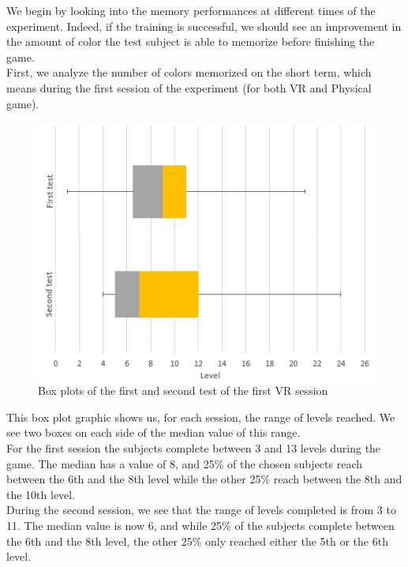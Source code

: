 \documentclass[12pt, openany, twocolumn]{article}
\begin{document}

    We begin by looking into the memory performances at different times of the experiment. Indeed, if the training is successful, we should see an improvement in the amount of color the test subject is able to memorize before finishing the game.
    \\
    First, we analyze the number of colors memorized on the short term, which means during the first session of the experiment (for both VR and Physical game).\\
    

        \begin{figure}
            \includegraphics[scale=0.74]{graphics/boxplot-vr-firstandsecondtest.png}
            \caption{Box plots of the first and second test of the first VR session}
        \end{figure}

        This box plot graphic shows us, for each session, the range of levels reached. We see two boxes on each side of the median value of this range. \\
        For the first session the subjects complete between 3 and 13 levels during the game. The median has a value of 8, and 25\% of the chosen subjects reach between the 6th and
        the 8th level while the other 25\% reach between the 8th and the 10th level. \\
        During the second session, we see that the range of levels completed is from 3 to 11. The median value is now 6, and while 25\% of the subjects complete between the 6th and the 8th level,
        the other 25\% only reached either the 5th or the 6th level. \\
\end{document}
